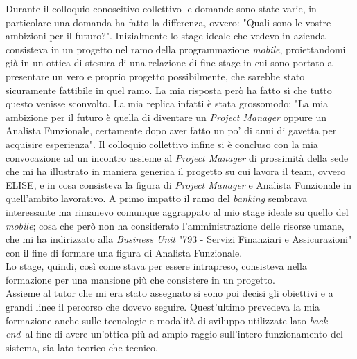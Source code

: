 Durante il colloquio conoscitivo collettivo le domande sono state varie, in particolare una domanda ha fatto la differenza, ovvero: "Quali sono le vostre ambizioni per il futuro?". Inizialmente lo stage ideale che vedevo in azienda consisteva in un progetto nel ramo della programmazione \textit{mobile}, proiettandomi già in un ottica di stesura di una relazione di fine stage in cui sono portato a presentare un vero e proprio progetto possibilmente, che sarebbe stato sicuramente fattibile in quel ramo. La mia risposta però ha fatto sì che tutto questo venisse sconvolto. La mia replica infatti è stata grossomodo: "La mia ambizione per il futuro è quella di diventare un \textit{Project Manager} oppure un Analista Funzionale, certamente dopo aver fatto un po' di anni di gavetta per acquisire esperienza". Il colloquio collettivo infine si è concluso con la mia convocazione ad un incontro assieme al \textit{Project Manager} di prossimità della sede che mi ha illustrato in maniera generica il progetto su cui lavora il team, ovvero ELISE\glossario, e in cosa consisteva la figura di \textit{Project Manager} e Analista Funzionale in quell'ambito lavorativo. A primo impatto il ramo del \textit{banking} sembrava interessante ma rimanevo comunque aggrappato al mio stage ideale su quello del \textit{mobile}; cosa che però non ha considerato l'amministrazione delle risorse umane, che mi ha indirizzato alla \textit{Business Unit} "793 - Servizi Finanziari e Assicurazioni" con il fine di formare una figura di Analista Funzionale.\\

Lo stage, quindi, così come stava per essere intrapreso, consisteva nella formazione per una mansione più che consistere in un progetto.\\

Assieme al tutor che mi era stato assegnato si sono poi decisi gli obiettivi e a grandi linee il percorso che dovevo seguire. Quest'ultimo prevedeva la mia formazione anche sulle tecnologie e modalità di sviluppo utilizzate lato \textit{back-end}\glossario\ al fine di avere un'ottica più ad ampio raggio sull'intero funzionamento del sistema, sia lato teorico che tecnico.
	

